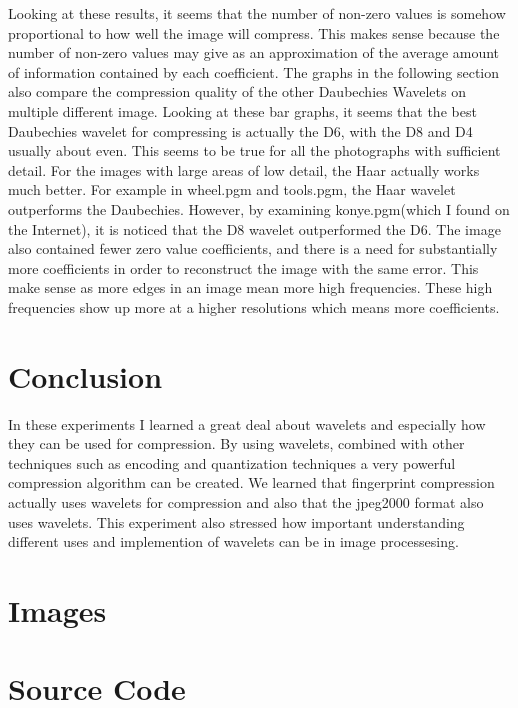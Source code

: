 Looking at these results, it seems that the number of non-zero values is somehow proportional to how well the image will compress.  This makes sense because the number of non-zero values may give as an approximation of the average amount of information contained by each coefficient.  The graphs in the following section also compare the compression quality of the other Daubechies Wavelets on multiple different image.  Looking at these bar graphs, it seems that the best Daubechies wavelet for compressing is actually the D6, with the D8 and D4 usually about even.  This seems to be true for all the photographs with sufficient detail.  For the images with large areas of low detail, the Haar actually works much better.  For example in wheel.pgm and tools.pgm, the Haar wavelet outperforms the Daubechies.  However, by examining konye.pgm(which I found on the Internet), it is noticed that the D8 wavelet outperformed the D6.  The image also contained fewer zero value coefficients, and there is a need for substantially more coefficients in order to reconstruct the image with the same error. This make sense as more edges in an image mean more high frequencies.  These high frequencies show up more at a higher resolutions which means more coefficients.

\section{Conclusion}

In these experiments I learned a great deal about wavelets and especially how they can be used for compression.  By using wavelets, combined with other techniques such as encoding and quantization techniques a very powerful compression algorithm can be created.  We learned that fingerprint compression actually uses wavelets for compression and also that the jpeg2000 format also uses wavelets.  This experiment also stressed how important understanding different uses and implemention of wavelets can be in image processesing.

\newpage

\section{Images}
  

\newpage

\section{Source Code}
